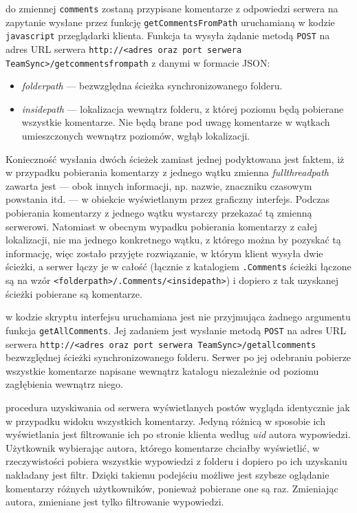 \begin{description}[noitemsep]
  \item[W widoku bieżącej lokalizacji] do zmiennej \texttt{comments} zostaną przypisane komentarze z odpowiedzi serwera na zapytanie wysłane przez funkcję \texttt{getCommentsFromPath} uruchamianą w kodzie \texttt{javascript} przeglądarki klienta. Funkcja ta wysyła żądanie metodą \texttt{POST} na adres URL serwera \texttt{http://<adres oraz port serwera TeamSync>\-/getcommentsfrompath} z danymi w formacie JSON:
  \begin{itemize}[noitemsep]
    \item \emph{folderpath} --- bezwzględna ścieżka synchronizowanego folderu.
    \item \emph{insidepath} --- lokalizacja wewnątrz folderu, z której poziomu będą pobierane wszystkie komentarze. Nie będą brane pod uwagę komentarze w wątkach umieszczonych wewnątrz poziomów, wgłąb lokalizacji.
  \end{itemize}
  Konieczność wysłania dwóch ścieżek zamiast jednej podyktowana jest faktem, iż w przypadku pobierania komentarzy z jednego wątku zmienna \emph{fullthreadpath} zawarta jest --- obok innych informacji, np. nazwie, znaczniku czasowym powstania itd. --- w obiekcie wyświetlanym przez graficzny interfejs. Podczas pobierania komentarzy z jednego wątku wystarczy przekazać tą zmienną serwerowi. Natomiast w obecnym wypadku pobierania komentarzy z całej lokalizacji, nie ma jednego konkretnego wątku, z którego można by pozyskać tą informację, więc zostało przyjęte rozwiązanie, w którym klient wysyła dwie ścieżki, a serwer łączy je w całość (łącznie z katalogiem \texttt{.Comments} ścieżki łączone są na wzór \texttt{<folderpath>/.Comments/<insidepath>}) i dopiero z tak uzyskanej ścieżki pobierane są komentarze.
  
  \item[W widoku wszystkich komentarzy] w kodzie skryptu interfejsu uruchamiana jest nie przyjmująca żadnego argumentu funkcja \texttt{get\-All\-Comments}. Jej zadaniem jest wysłanie metodą \texttt{POST} na adres URL serwera \texttt{http://<adres oraz port serwera TeamSync>/getallcomments} bezwzględnej ścieżki synchronizowanego folderu. Serwer po jej odebraniu pobierze wszystkie komentarze napisane wewnątrz katalogu niezależnie od poziomu zagłębienia wewnątrz niego.
  
  \item[W widoku wszystkich komentarzy użytkownika] procedura uzyskiwania od serwera wyświetlanych postów wygląda identycznie jak w przypadku widoku wszystkich komentarzy. Jedyną różnicą w sposobie ich wyświetlania jest filtrowanie ich po stronie klienta według \emph{uid} autora wypowiedzi. Użytkownik wybierając autora, którego komentarze chciałby wyświetlić, w rzeczywistości pobiera wszystkie wypowiedzi z folderu i dopiero po ich uzyskaniu nakładany jest filtr. Dzięki takiemu podejściu możliwe jest szybsze oglądanie komentarzy różnych użytkowników, ponieważ pobierane one są raz. Zmieniając autora, zmieniane jest tylko filtrowanie wypowiedzi.
\end{description}

